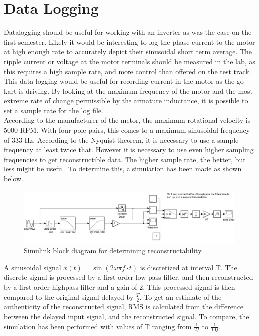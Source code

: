 
\section{Data Logging}

Datalogging should be useful for working with an inverter as was the case on the first semester.
Likely it would be interesting to log the phase-current to the motor at high enough rate to accurately depict their sinusoidal short term average.
The ripple current or voltage at the motor terminals should be measured in the lab, as this requires a high sample rate, and more control than offered on the test track.
This data logging would be useful for recording current in the motor as the go kart is driving.
By looking at the maximum frequency of the motor and the most extreme rate of change permissible by the armature inductance, it is possible to set a sample rate for the log file.\\

According to the manufacturer of the motor, the maximum rotational velocity is 5000 RPM.
With four pole pairs, this comes to a maximum sinusoidal frequency of 333 Hz. 
According to the Nyquist theorem, it is necessary to use a sample frequency at least twice that. 
However it is necessary to use even higher sampling frequencies to get reconstructible data.
The higher sample rate, the better, but less might be useful.
To determine this, a simulation has been made as shown below.\\

\begin{figure}[H]
	\centering
	\includegraphics{graphics/determine_max_frequency.png}
	\caption{Simulink block diagram for determining reconstructability}
	\label{fig:determine_max_frequency}
\end{figure}


A sinusoidal signal $x(t) = \sin(2\omega \pi f \cdot t)$ is discretized at interval T. 
The discrete signal is processed by a first order low pass filter, and then reconstructed by a first order highpass filter and a gain of 2.
This processed signal is then compared to the original signal delayed by $\frac{T}{2}$.
To get an estimate of the authenticity of the reconstructed signal, RMS is calculated from the difference between the delayed input signal, and the reconstructed signal.
To compare, the simulation has been performed with values of T ranging from $\frac{1}{2f}$ to $\frac{1}{10f}$.\\

